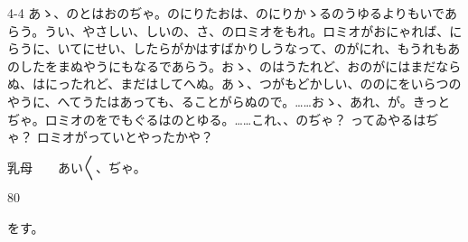 \documentclass[tate,paper=b6j,jafontsize=9pt]{jlreq}
\begin{document}
\begin{azconvIndented}{4\zw}{-4\zw}
あゝ、のとはおのぢゃ。のにりたおは、のにりかゝるのうゆるよりもいであらう。うい、やさしい、しいの、さ、のロミオをもれ。ロミオがおにゃれば、にらうに、いてにせい、したらがかはすばかりしうなって、のがにれ、もうれもあのしたをまぬやうにもなるであらう。おゝ、のはうたれど、おのがにはまだならぬ、はにったれど、まだはしてへぬ。あゝ、つがもどかしい、ののにをいらつのやうに、へてうたはあっても、ることがらぬので。……おゝ、あれ、が。きっとぢゃ。ロミオのをでもぐるはのとゆる。……これ、、のぢゃ？ ってゐやるはぢゃ？ ロミオがっていとやったかや？

乳母　　あい{〳〵}、ぢゃ。

\end{azconvIndented}
\begin{azconvIndented}{8\zw}{0\zw}

をす。

\end{azconvIndented}
\end{document}
